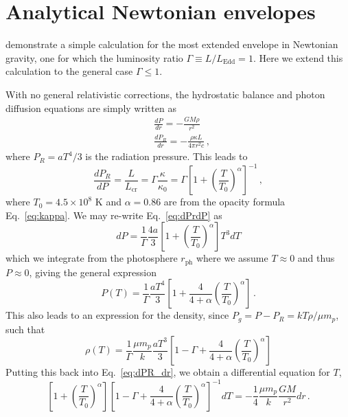 \documentclass[../main.tex]{subfiles}
\begin{document}
\chapter{Analytical Newtonian envelopes}\label{appendix_newtonian}
\citet{Paczynski1986a} demonstrate a simple calculation for the most extended envelope in Newtonian gravity, one for which the luminosity ratio $\Gamma\equiv L/L_\text{Edd}=1$. Here we extend this calculation to the general case $\Gamma\leq 1$.

With no general relativistic corrections, the hydrostatic balance and photon diffusion equations are simply written as
\begin{align}
	&\frac{dP}{dr}=-\frac{GM\rho}{r^2}\\
	&\frac{dP_R}{dr}=-\frac{\rho\kappa L}{4\pi r^2c}\,,\label{eq:dPR_dr}
\end{align}
where $P_R=aT^4/3$ is the radiation pressure. This leads to
\begin{equation}\label{eq:dPrdP}
	\frac{dP_R}{dP}=\frac{L}{L_\text{cr}}=\Gamma\frac{\kappa}{\kappa_0}=\Gamma\left[1+\left(\frac{T}{T_0}\right)^\alpha\right]^{-1}\,,
\end{equation}
where $T_0=4.5\times10^8$ K and $\alpha=0.86$ are from the opacity formula Eq.~\eqref{eq:kappa}. We may re-write Eq.~\eqref{eq:dPrdP} as 
\begin{equation}
	dP=\frac{1}{\Gamma}\frac{4a}{3}\left[1+\left(\frac{T}{T_0}\right)^\alpha\right]T^3dT
\end{equation}
which we integrate from the photosphere $r_\text{ph}$ where we assume $T\approx 0$ and thus $P\approx 0$, giving the general expression
\begin{equation}
	P(T) = \frac{1}{\Gamma}\frac{aT^4}{3}\left[1+\frac{4}{4+\alpha}\left(\frac{T}{T_0}\right)^\alpha\right]\,.
\end{equation}
This also leads to an expression for the density, since $P_g=P-P_R=kT\rho/\mu m_p$, such that
\begin{equation}
	\rho(T)=\frac{1}{\Gamma}\frac{\mu m_p}{k}\frac{aT^3}{3}\left[1-\Gamma+\frac{4}{4+\alpha}\left(\frac{T}{T_0}\right)^\alpha\right]
\end{equation}
Putting this back into Eq.~\eqref{eq:dPR_dr}, we obtain a differential equation for $T$,
\begin{equation}
	\left[1+\left(\frac{T}{T_0}\right)^\alpha\right]\left[1-\Gamma+\frac{4}{4+\alpha}\left(\frac{T}{T_0}\right)^\alpha\right]^{-1}dT=-\frac{1}{4}\frac{\mu m_p}{k}\frac{GM}{r^2}dr \,.
\end{equation}
\end{document}
